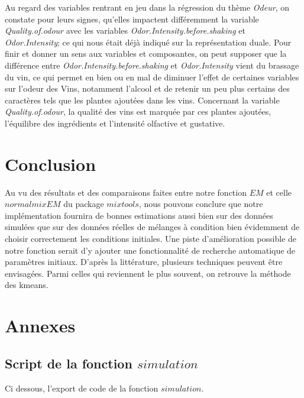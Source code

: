 \documentclass[a4paper,french,10pt]{article}
\begin{document}
\bigskip

Au regard des variables rentrant en jeu dans la régression du thème \textit{Odeur}, on constate pour leurs signes, qu'elles impactent différemment la variable \textit{Quality.of.odour} avec les variables \textit{Odor.Intensity.before.shaking} et \textit{Odor.Intensity}; ce qui nous était déjà indiqué sur la représentation duale. \newline
Pour finir et donner un sens aux variables et composantes, on peut supposer que la différence entre \textit{Odor.Intensity.before.shaking} et \textit{Odor.Intensity} vient du brassage du vin, ce qui permet en bien ou en mal de diminuer l'effet de certaines variables sur l'odeur des Vins, notamment l'alcool et de retenir un peu plus certains des caractères tels que les plantes ajoutées dans les vins. Concernant la variable \textit{Quality.of.odour}, la qualité des vins est marquée par ces plantes ajoutées, l'équilibre des ingrédients et l'intensité olfactive et gustative. 

\newpage

\section{Conclusion}

Au vu des résultats et des comparaisons faites entre notre fonction $EM$ et celle $normalmixEM$ du package $mixtools$, nous pouvons conclure que notre implémentation fournira de bonnes estimations aussi bien sur des données simulées que sur des données réelles de mélanges à condition bien évidemment de choisir correctement les conditions initiales. Une piste d'amélioration possible de notre fonction serait d'y ajouter une fonctionnalité de recherche automatique de paramètres initiaux. D'après la littérature, plusieurs techniques peuvent être envisagées. Parmi celles qui reviennent le plus souvent, on retrouve la méthode des kmeans.


\newpage


\section{Annexes}
\subsection{Script de la fonction $simulation$}
Ci dessous, l'export de code de la fonction $simulation$.

\end{document}
